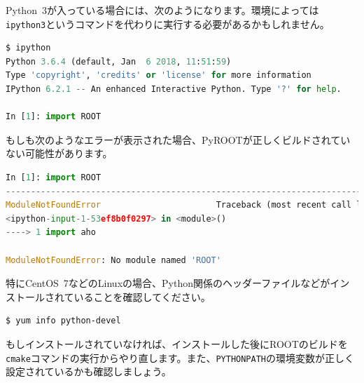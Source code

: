 Python~3が入っている場合には、次のようになります。環境によっては\texttt{ipython3}というコマンドを代わりに実行する必要があるかもしれません。
\begin{lstlisting}[language=python]
$ ipython
Python 3.6.4 (default, Jan  6 2018, 11:51:59) 
Type 'copyright', 'credits' or 'license' for more information
IPython 6.2.1 -- An enhanced Interactive Python. Type '?' for help.

In [1]: import ROOT
\end{lstlisting}
もしも次のようなエラーが表示された場合、PyROOTが正しくビルドされていない可能性があります。
\begin{lstlisting}[language=python]
In [1]: import ROOT
---------------------------------------------------------------------------
ModuleNotFoundError                       Traceback (most recent call last)
<ipython-input-1-53ef8b0f0297> in <module>()
----> 1 import aho

ModuleNotFoundError: No module named 'ROOT'
\end{lstlisting}
特にCentOS~7などのLinuxの場合、Python関係のヘッダーファイルなどがインストールされていることを確認してください。
\begin{lstlisting}[language=bash]
$ yum info python-devel
\end{lstlisting}
もしインストールされていなければ、インストールした後にROOTのビルドを\texttt{cmake}コマンドの実行からやり直します。また、\texttt{PYTHONPATH}の環境変数が正しく設定されているかも確認しましょう。

